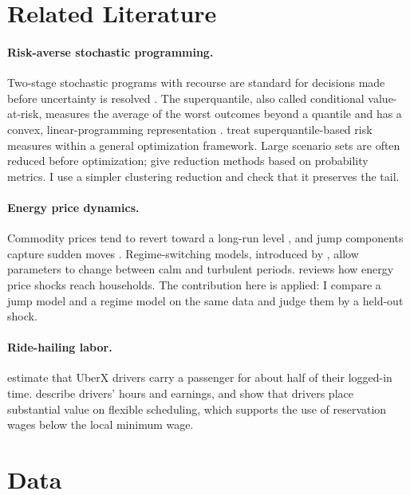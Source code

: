 \documentclass[11pt]{article}
\begin{document}
\section{Related Literature}\label{sec:lit}

\paragraph{Risk-averse stochastic programming.} Two-stage stochastic programs with recourse are standard for decisions made before uncertainty is resolved \citep{birge2011}. The superquantile, also called conditional value-at-risk, measures the average of the worst outcomes beyond a quantile and has a convex, linear-programming representation \citep{rockafellar2000,rockafellar2002}. \citet{royset2021} treat superquantile-based risk measures within a general optimization framework. Large scenario sets are often reduced before optimization; \citet{heitsch2003} give reduction methods based on probability metrics. I use a simpler clustering reduction and check that it preserves the tail.

\paragraph{Energy price dynamics.} Commodity prices tend to revert toward a long-run level \citep{schwartz1997}, and jump components capture sudden moves \citep{merton1976}. Regime-switching models, introduced by \citet{hamilton1989}, allow parameters to change between calm and turbulent periods. \citet{kilian2008} reviews how energy price shocks reach households. The contribution here is applied: I compare a jump model and a regime model on the same data and judge them by a held-out shock.

\paragraph{Ride-hailing labor.} \citet{cramer2016} estimate that UberX drivers carry a passenger for about half of their logged-in time. \citet{hall2018} describe drivers' hours and earnings, and \citet{chen2019} show that drivers place substantial value on flexible scheduling, which supports the use of reservation wages below the local minimum wage.

\section{Data}\label{sec:data}
\end{document}
